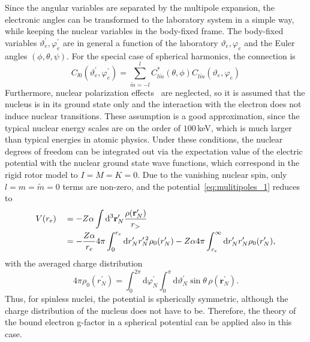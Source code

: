 Since the angular variables are separated by the multipole expansion, the electronic angles can be transformed to the laboratory system in a simple way, while keeping the nuclear variables in the body-fixed frame. The body-fixed variables $\vartheta^{\prime}_e,\varphi^\prime_e$ are in general a function of the laboratory $\vartheta_e,\varphi_e$ and the Euler angles $(\phi,\theta,\psi)$. For the special case of spherical harmonics, the connection is
\begin{equation}
C_{l0}(\vartheta_e^\prime,\varphi_e^\prime) = \sum_{\tilde{m}=-l}^l C^{*}_{l\tilde{m}}(\theta,\phi)C_{l\tilde{m}}(\vartheta_e,\varphi_e)
\end{equation}
Furthermore, nuclear polarization effects~\cite{Nefiodov} are neglected, so it is assumed that the nucleus is in its ground state only and the interaction with the electron does not induce nuclear transitions. These assumption is a good approximation, since the typical nuclear energy scales are on the order of $100\,$keV, which is much larger than typical energies in atomic physics. Under these conditions, the nuclear degrees of freedom can be integrated out via the expectation value of the electric potential with the nuclear ground state wave functions, which correspond in the rigid rotor model to $I=M=K=0$. Due to the vanishing nuclear spin, only $l=m=\tilde{m}=0$ terms are non-zero, and the potential~\eqref{eq:mulitipoles_1} reduces to
\begin{alignat}{2}
\label{eq:gfac_monopole}
&V(r_e)&&=-Z\alpha \int\mathrm{d}^3\mathbf{r}^\prime_N\frac{\rho(\mathbf{r}_N^\prime)}{r_>}\\
& &&= -\frac{Z\alpha}{r_e} 4\pi\int_0^{r_e}\mathrm{d}r_N^\prime r_N^{\prime\,2}\rho_0(r_N^\prime) 
-Z\alpha 4\pi\int_{r_e}^\infty\mathrm{d}r_N^\prime r_N^{\prime}\rho_0(r_N^\prime), \notag
\end{alignat}
with the averaged charge distribution
\begin{equation}
\label{eq:rho_averaged}
4\pi\rho_0(r^\prime_N)=\int_0^{2\pi}\mathrm{d}\varphi_N^\prime \int_0^\pi \mathrm{d}\vartheta_N^\prime \sin\theta\,\rho(\mathbf{r}_N^\prime).
\end{equation}
Thus, for spinless nuclei, the potential is spherically symmetric, although the charge distribution of the nucleus does not have to be. Therefore, the theory of the bound electron g-factor in a spherical potential can be applied also in this case.

